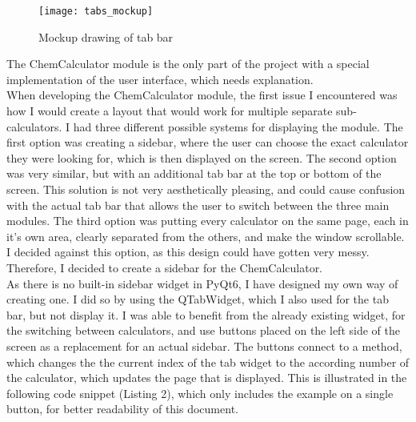 \documentclass[a4paper,12pt]{article}
\begin{document}
\begin{figure} [h]
	\centering
	\texttt{[image: tabs\_mockup]}
	\caption{Mockup drawing of tab bar}
	\label{fig:tabs_mockup}
\end{figure}

The ChemCalculator module is the only part of the project with a special implementation of the user interface, which needs explanation.\\

When developing the ChemCalculator module, the first issue I encountered was how I would create a layout that would work for multiple separate sub-calculators. I had three different possible systems for displaying the module. The first option was creating a sidebar, where the user can choose the exact calculator they were looking for, which is then displayed on the screen. The second option was very similar, but with an additional tab bar at the top or bottom of the screen. This solution is not very aesthetically pleasing, and could cause confusion with the actual tab bar that allows the user to switch between the three main modules. The third option was putting every calculator on the same page, each in it's own area, clearly separated from the others, and make the window scrollable. I decided against this option, as this design could have gotten very messy. Therefore, I decided to create a sidebar for the ChemCalculator. \\
As there is no built-in sidebar widget in PyQt6, I have designed my own way of creating one. I did so by using the QTabWidget, which I also used for the tab bar, but not display it. I was able to benefit from the already existing widget, for the switching between calculators, and use buttons placed on the left side of the screen as a replacement for an actual sidebar. The buttons connect to a method, which changes the the current index of the tab widget to the according number of the calculator, which updates the page that is displayed. This is illustrated in the following code snippet (Listing 2), which only includes the example on a single button, for better readability of this document.
\end{document}
